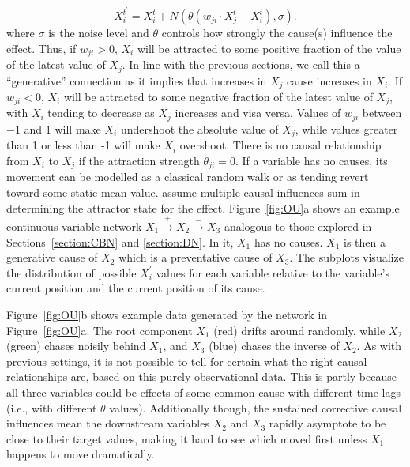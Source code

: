 \documentclass{cambridge7A}%
\begin{document}
\begin{equation} \label{cont_OU_def}
X_i^{t^{\prime}} = X_i^{t} + N(\theta ( w_{ji} \cdot X_j^t - X_i^t),\sigma).
\end{equation}
where %
$\sigma$ is the noise level and $\theta$ controls how strongly the cause(s) influence the effect.  
Thus, if $w_{ji}>0$, $X_i$ will be attracted to some positive fraction of the value of the latest value of $X_j$.  In line with the previous sections, we call this a ``generative'' connection as it implies that increases in $X_j$ cause increases in $X_i$.  If $w_{ji}<0$, $X_i$ will be attracted to some negative fraction of the latest value of $X_j$, with $X_i$ tending to decrease as $X_j$ increases and visa versa.  Values of $w_{ji}$ between $-1$ and $1$ will make $X_i$ undershoot the absolute value of $X_j$, while values greater than 1 or less than -1 will make $X_i$ overshoot. There is no causal relationship from $X_i$ to $X_j$ if 
the attraction strength $\theta_{ji}=0$.  If a variable has no causes, its movement can be modelled as a classical random walk or as tending revert toward some static mean value.  
\cite{davis2018ctcv} assume multiple causal influences sum in determining the attractor state for the effect.  
Figure~\ref{fig:OU}a shows an example continuous variable network $X_1\!\stackrel{+}\rightarrow\!X_2\!\stackrel{-}\rightarrow\!X_3$ analogous to those explored in Sections~\ref{section:CBN} and \ref{section:DN}.  In it, $X_1$ has no causes.  $X_1$ is then a generative cause of $X_2$ 
which is a preventative cause of $X_3$. 
The subplots visualize the distribution of possible $X_i^{\prime}$ values for each variable relative to the variable's current position and the current position of its cause.

Figure~\ref{fig:OU}b shows example data generated by the network in Figure~\ref{fig:OU}a.  The root component $X_1$ (red) drifts around randomly, while $X_2$ (green) chases noisily behind $X_1$, and $X_3$ (blue) chases the inverse of $X_2$.  As with previous settings, it is not possible to tell for certain what the right causal relationships are, based on this purely observational data.  This is partly because all three variables could be effects of some common cause with different time lags (i.e., with different $\theta$ values). Additionally though, the sustained corrective causal influences mean the downstream variables $X_2$ and $X_3$ rapidly asymptote to be close to their target values, making it hard to see which moved first unless $X_1$ happens to move dramatically.  
\end{document}
